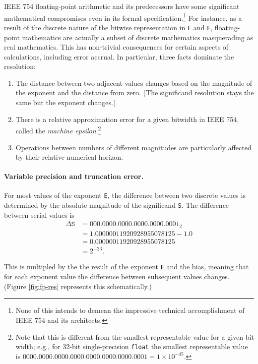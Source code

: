 \documentclass[twoside]{article}
\begin{document}
IEEE 754 floating-point arithmetic and its predecessors have some significant mathematical compromises even in its formal specification.\footnote{None of this intends to demean the impressive technical accomplishment of IEEE 754 and its architects.}  For instance, as a result of the discrete nature of the bitwise representation in \texttt{E} and \texttt{F}, floating-point mathematics are actually a subset of discrete mathematics masquerading as real mathematics.  This has non-trivial consequences for certain aspects of calculations, including error accrual.  In particular, three facts dominate the resolution:

\begin{enumerate}
  \item  The distance between two adjacent values changes based on the magnitude of the exponent and the distance from zero.  (The significand resolution stays the same but the exponent changes.)
  \item  There is a relative approximation error for a given bitwidth in IEEE 754, called the \emph{machine epsilon}.\footnote{Note that this is different from the smallest representable value for a given bit width; e.g., for 32-bit single-precision \texttt{float} the smallest representable value is $\mathtt{0000.0000.0000.0000.0000.0000.0000.0001} = 1\times 10^{-45}$.}
  \item  Operations between numbers of different magnitudes are particularly affected by their relative numerical horizon.
\end{enumerate}

\paragraph{Variable precision and truncation error.}

For most values of the exponent \texttt{E}, the difference between two discrete values is determined by the absolute magnitude of the significand \texttt{S}.  The difference between serial values is
\begin{align}
  \Delta\mathtt{S} &= \mathtt{000.0000.0000.0000.0000.0001}_{2} \nonumber \\
  & = 1.00000011920928955078125 - 1.0 \nonumber \\
  & = 0.00000011920928955078125 \nonumber \\
  & = 2^{-23}\textrm{.}
\end{align}

\noindent
This is multipled by the the result of the exponent \texttt{E} and the bias, meaning that for each exponent value the difference between subsequent values changes.  (Figure \ref{fig:fp-res} represents this schematically.)
\end{document}
